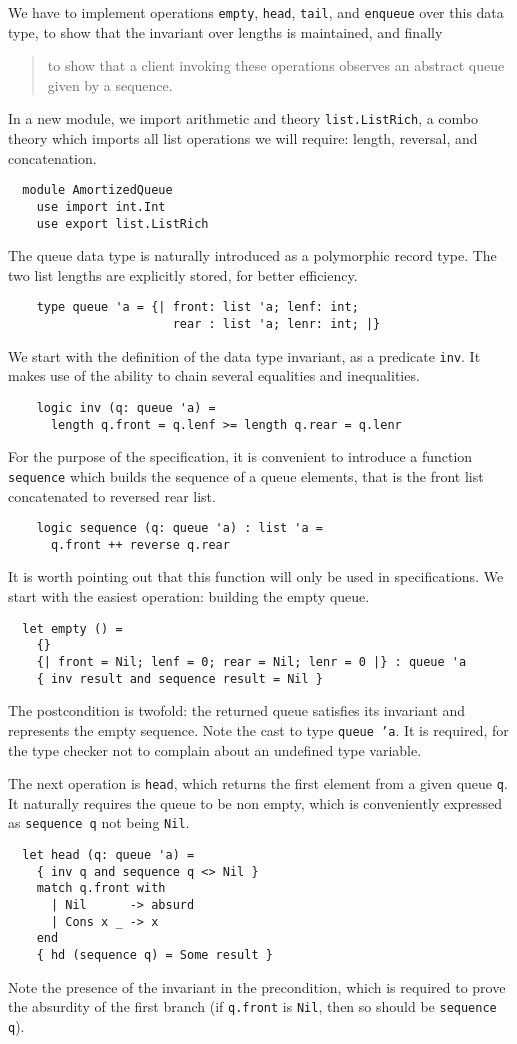 We have to implement operations \texttt{empty}, \texttt{head},
\texttt{tail}, and \texttt{enqueue} over this data type,
to show that the invariant over lengths is maintained, and finally
\begin{quote}
  to show that a client invoking these operations
  observes an abstract queue given by a sequence.
\end{quote}
In a new module, we import arithmetic and theory
\texttt{list.ListRich}, a combo theory which imports all list
operations we will require: length, reversal, and concatenation.
\begin{verbatim}
  module AmortizedQueue
    use import int.Int
    use export list.ListRich
\end{verbatim}
The queue data type is naturally introduced as a polymorphic record type.
The two list lengths are explicitly stored, for better efficiency.
\begin{verbatim}
    type queue 'a = {| front: list 'a; lenf: int;
                       rear : list 'a; lenr: int; |}
\end{verbatim}
We start with the definition of the data type invariant, as a
predicate \texttt{inv}. It makes use of the ability to chain
several equalities and inequalities.
\begin{verbatim}
    logic inv (q: queue 'a) =
      length q.front = q.lenf >= length q.rear = q.lenr
\end{verbatim}
For the purpose of the specification, it is convenient to introduce a function
\texttt{sequence} which builds the sequence of a queue elements, that
is the front list concatenated to reversed rear list.
\begin{verbatim}
    logic sequence (q: queue 'a) : list 'a =
      q.front ++ reverse q.rear
\end{verbatim}
It is worth pointing out that this function will only be used in
specifications.
We start with the easiest operation: building the empty queue.
\begin{verbatim}
  let empty () =
    {}
    {| front = Nil; lenf = 0; rear = Nil; lenr = 0 |} : queue 'a
    { inv result and sequence result = Nil }
\end{verbatim}
The postcondition is twofold: the returned queue satisfies its
invariant and represents the empty sequence.
Note the cast to type \texttt{queue 'a}. It is required, for the
type checker not to complain about an undefined type variable.

The next operation is \texttt{head}, which returns the first element from
a given queue \texttt{q}. It naturally requires the queue to be non
empty, which is conveniently expressed as \texttt{sequence q} not
being \texttt{Nil}.
\begin{verbatim}
  let head (q: queue 'a) =
    { inv q and sequence q <> Nil }
    match q.front with
      | Nil      -> absurd
      | Cons x _ -> x
    end
    { hd (sequence q) = Some result }
\end{verbatim}
Note the presence of the invariant in the precondition, which is
required to prove the absurdity of the first branch (if
\texttt{q.front} is \texttt{Nil}, then so should be \texttt{sequence q}).

